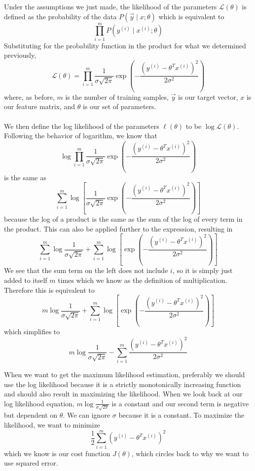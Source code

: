 \documentclass[11pt]{article}
\begin{document}
Under the assumptions we just made, the likelihood of the parameters $\mathcal{L}(\theta)$ is defined as the probability of the data $P(\Vec{y} \mid x;\theta)$ which is equivalent to
$$\prod_{i=1}^{m} P\left(y^{(i)}\mid x^{(i)};\theta\right)$$
Substituting for the probability function in the product for what we determined previously,
$$\mathcal{L}(\theta) = \prod_{i=1}^{m} \frac{1}{\sigma \sqrt{2\pi}} \exp{\left(-\frac{\left(y^{(i)} - \theta^T x^{(i)}\right)^2}{2\sigma^2}\right)}$$
where, as before, $m$ is the number of training samples, $\Vec{y}$ is our target vector, $x$ is our feature matrix, and $\theta$ is our set of parameters. \hfill \\
\vspace{0em} \\
We then define the log likelihood of the parameters $\ell(\theta)$ to be $\log{\mathcal{L}(\theta)}$. Following the behavior of logarithm, we know that $$\log{\prod_{i=1}^{m} \frac{1}{\sigma \sqrt{2\pi}} \exp{\left(-\frac{\left(y^{(i)} - \theta^T x^{(i)}\right)^2}{2\sigma^2}\right)}}$$ is the same as $$\sum_{i=1}^{m} \log{\left[\frac{1}{\sigma \sqrt{2\pi}} \exp{\left(-\frac{\left(y^{(i)} - \theta^T x^{(i)}\right)^2}{2\sigma^2}\right)}\right]}$$ because the log of a product is the same as the sum of the log of every term in the product. This can also be applied further to the expression, resulting in $$\sum_{i=1}^{m} \log{\frac{1}{\sigma \sqrt{2\pi}}}+\sum_{i=1}^{m} \log{\left[\exp{\left(-\frac{\left(y^{(i)} - \theta^T x^{(i)}\right)^2}{2\sigma^2}\right)}\right]}$$
We see that the sum term on the left does not include $i$, so it is simply just added to itself $m$ times which we know as the definition of multiplication. Therefore this is equivalent to $$m\log{\frac{1}{\sigma \sqrt{2\pi}}} + \sum_{i=1}^{m} \log{\left[\exp{\left(-\frac{\left(y^{(i)} - \theta^T x^{(i)}\right)^2}{2\sigma^2}\right)}\right]}$$ which simplifies to $$m\log{\frac{1}{\sigma \sqrt{2\pi}}} - \sum_{i=1}^{m} \frac{\left(y^{(i)} - \theta^T x^{(i)}\right)^2}{2\sigma^2}$$

When we want to get the maximum likelihood estimation, preferably we should use the log likelihood because it is a strictly monotonically increasing function and should also result in maximizing the likelihood. When we look back at our log likelihood equation, $m\log{\frac{1}{\sigma \sqrt{2\pi}}}$ is a constant and our second term is negative but dependent on $\theta$. We can ignore $\sigma$ because it is a constant. To maximize the likelihood, we want to minimize $$\frac{1}{2} \sum_{i=1}^{m} \left(y^{(i)} - \theta^T x^{(i)}\right)^2$$ which we know is our cost function $J(\theta)$, which circles back to why we want to use squared error.
\end{document}

